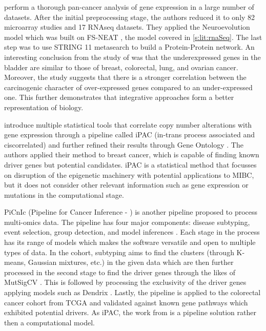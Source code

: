 \citet{Feltes2020-bz} perform a thorough pan-cancer analysis of gene expression in a large number of datasets. After the initial preprocessing stage, the authors reduced it to only 82 microarray studies and 17 RNAseq datasets. They applied the Neuroevolution model \citep{Grisci2019-xn} which was built on FS-NEAT \citep{Whiteson2005-dn}, the model covered in \cref{s:lit:rnaSeq}. The last step was to use STRING 11 \citep{Szklarczyk2019-pu} metasearch to build a Protein-Protein network. An interesting conclusion from the study of \citet{Feltes2020-bz} was that the underexpressed genes in the bladder are similar to those of breast, colorectal, lung, and ovarian cancer. Moreover, the study suggests that there is a stronger correlation between the carcinogenic character of over-expressed genes compared to an under-expressed one. This further demonstrates that integrative approaches form a better representation of biology.

\citet{Aure2013-je} introduce multiple statistical tools that correlate copy number alterations with gene expression through a pipeline called iPAC (in-trans process associated and ciscorrelated) and further refined their results through Gene Ontology \citep{Thomas2022-kn}. The authors applied their method to breast cancer, which is capable of finding known driver genes but potential candidates. iPAC is a statistical method that focusses on disruption of the epigenetic machinery with potential applications to MIBC, but it does not consider other relevant information such as gene expression or mutations in the computational stage.


PiCnIc (Pipeline for Cancer Inference - \cite{Caravagna2016-vw}) is another pipeline proposed to process multi-omics data. The pipeline has four major components: disease subtyping, event selection, group detection, and model inferences \citep{Caravagna2016-vw}. Each stage in the process has its range of models which makes the software versatile and open to multiple types of data. In the cohort, subtyping aims to find the clusters (through K-means, Gaussian mixtures, etc.) in the given data which are then further processed in the second stage to find the driver genes through the likes of MutSigCV \citep{Lawrence2013-pl}. This is followed by processing the exclusivity of the driver genes applying models such as Dendrix \citep{Vandin2012-cf, Zhao2012-wj}. Lastly, the pipeline is applied to the colorectal cancer cohort from TCGA and validated against known gene pathways which exhibited potential drivers. As iPAC, the work from \cite{Caravagna2016-vw} is a pipeline solution rather then a computational model.

